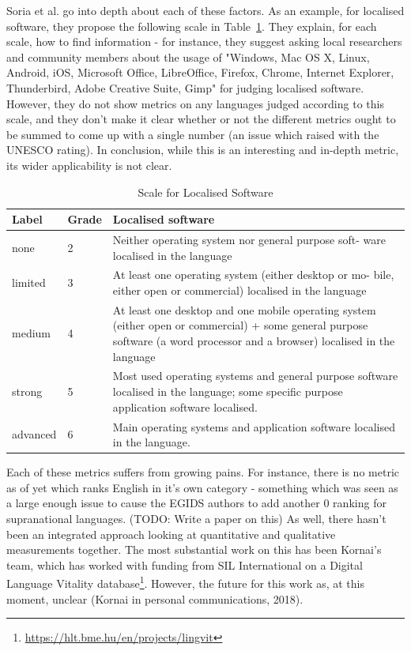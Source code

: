 Soria et al. go into depth about each of these factors. As an example, for localised software, they propose the following scale in Table~\ref{table:dldp-software}. They explain, for each scale, how to find information - for instance, they suggest asking local researchers and community members about the usage of "Windows, Mac OS X, Linux, Android, iOS, Microsoft Office, LibreOffice, Firefox, Chrome, Internet Explorer, Thunderbird, Adobe Creative Suite, Gimp" for judging localised software. However, they do not show metrics on any languages judged according to this scale, and they don't make it clear whether or not the different metrics ought to be summed to come up with a single number (an issue which \citet{lee2016assessing} raised with the UNESCO rating). In conclusion, while this is an interesting and in-depth metric, its wider applicability is not clear.

\begin{table}
\begin{center}
\begin{tabular}{|p{2cm}|p{1cm}|p{10cm}|} \hline
Label & Grade & Localised software \\ \hline
none & 2 & Neither operating system nor general purpose soft- ware localised in the language\\
limited & 3 & At least one operating system (either desktop or mo- bile, either open or commercial) localised in the language \\
medium & 4 & At least one desktop and one mobile operating system (either open or commercial) + some general purpose software (a word processor and a browser) localised in the language\\
strong & 5 & Most used operating systems and general purpose software localised in the language; some specific purpose application software localised.\\
advanced & 6 & Main operating systems and application software localised in the language.  \\ \hline
\end{tabular}
\end{center}
\caption{Scale for Localised Software}
\label{table:dldp-software}
\end{table}

Each of these metrics suffers from growing pains. For instance, there is no metric as of yet which ranks English in it's own category - something which was seen as a large enough issue to cause the EGIDS authors to add another 0 ranking for supranational languages. (TODO: Write a paper on this) As well, there hasn't been an integrated approach looking at quantitative and qualitative measurements together. The most substantial work on this has been Kornai's team, which has worked with funding from SIL International on a Digital Language Vitality database\footnote{\href{https://hlt.bme.hu/en/projects/lingvit}{https://hlt.bme.hu/en/projects/lingvit}}. However, the future for this work as, at this moment, unclear (Kornai in personal communications, 2018).

